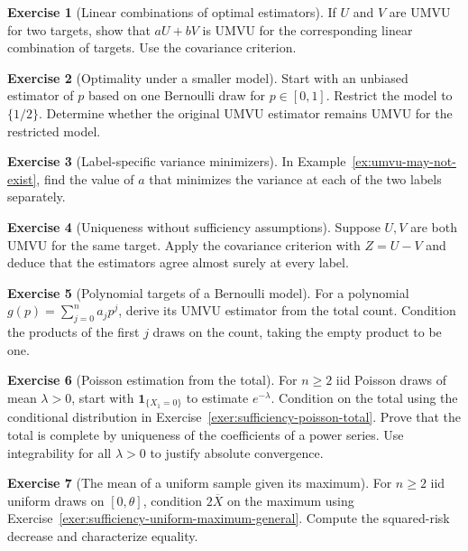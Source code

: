 \documentclass[11pt,oneside]{book}
\theoremstyle{definition}
\newtheorem{exercise}{Exercise}[section]
\theoremstyle{remark}
\begin{document}
\begin{exercise}[Linear combinations of optimal estimators]
\label{exer:umvu-linear-combination}
If $U$ and $V$ are UMVU for two targets, show that $aU+bV$
is UMVU for the corresponding linear combination of targets.
Use the covariance criterion.
\end{exercise}

\begin{exercise}[Optimality under a smaller model]
\label{exer:umvu-model-restriction}
Start with an unbiased estimator of $p$ based on one Bernoulli draw
for $p\in[0,1]$. Restrict the model to $\{1/2\}$. Determine whether
the original UMVU estimator remains UMVU for the restricted model.
\end{exercise}

\begin{exercise}[Label-specific variance minimizers]
\label{exer:umvu-no-common-minimizer}
In Example~\ref{ex:umvu-may-not-exist}, find the value of $a$
that minimizes the variance at each of the two labels separately.
\end{exercise}

\begin{exercise}[Uniqueness without sufficiency assumptions]
\label{exer:umvu-uniqueness-midpoint}
Suppose $U,V$ are both UMVU for the same target. Apply the
covariance criterion with $Z=U-V$ and deduce that the
estimators agree almost surely at every label.
\end{exercise}

\begin{exercise}[Polynomial targets of a Bernoulli model]
\label{exer:umvu-bernoulli-polynomial}
For a polynomial $g(p)=\sum_{j=0}^n a_j p^j$, derive its
UMVU estimator from the total count. Condition the products
of the first $j$ draws on the count, taking the empty product
to be one.
\end{exercise}

\begin{exercise}[Poisson estimation from the total]
\label{exer:rao-blackwell-poisson-zero}
For $n\geq2$ iid Poisson draws of mean $\lambda>0$, start with
$\mathbf 1_{\{X_1=0\}}$ to estimate $e^{-\lambda}$. Condition
on the total using the conditional distribution in
Exercise~\ref{exer:sufficiency-poisson-total}. Prove that the
total is complete by uniqueness of the coefficients of a power series.
Use integrability for all $\lambda>0$ to justify absolute convergence.
\end{exercise}

\begin{exercise}[The mean of a uniform sample given its maximum]
\label{exer:rao-blackwell-uniform-full-mean}
For $n\geq2$ iid uniform draws on $[0,\theta]$, condition
$2\overline X$ on the maximum using
Exercise~\ref{exer:sufficiency-uniform-maximum-general}.
Compute the squared-risk decrease and characterize equality.
\end{exercise}
\end{document}
